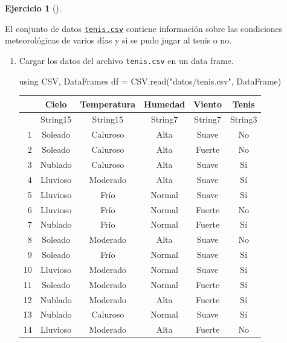 \documentclass[
  a4paper,
]{scrreport}
\newenvironment{Shaded}{\begin{snugshade}}{\end{snugshade}}
\newcommand{\BuiltInTok}[1]{\textcolor[rgb]{0.00,0.23,0.31}{#1}}
\newcommand{\FunctionTok}[1]{\textcolor[rgb]{0.28,0.35,0.67}{#1}}
\newcommand{\ImportTok}[1]{\textcolor[rgb]{0.00,0.46,0.62}{#1}}
\newcommand{\NormalTok}[1]{\textcolor[rgb]{0.00,0.23,0.31}{#1}}
\newcommand{\OperatorTok}[1]{\textcolor[rgb]{0.37,0.37,0.37}{#1}}
\newcommand{\StringTok}[1]{\textcolor[rgb]{0.13,0.47,0.30}{#1}}
\theoremstyle{definition}
\newtheorem{exercise}{Ejercicio}[chapter]
\theoremstyle{remark}
\begin{document}
\begin{exercise}[]\protect\hypertarget{exr-arboles-decision-1}{}\label{exr-arboles-decision-1}

El conjunto de datos \href{./datos/tenis.csv}{\texttt{tenis.csv}}
contiene información sobre las condiciones meteorológicas de varios días
y si se pudo jugar al tenis o no.

\begin{enumerate}
\def\labelenumi{\alph{enumi}.}
\item
  Cargar los datos del archivo \texttt{tenis.csv} en un data frame.

  \begin{tcolorbox}[enhanced jigsaw, toptitle=1mm, colframe=quarto-callout-tip-color-frame, titlerule=0mm, left=2mm, arc=.35mm, colbacktitle=quarto-callout-tip-color!10!white, opacityback=0, bottomtitle=1mm, toprule=.15mm, coltitle=black, breakable, colback=white, rightrule=.15mm, opacitybacktitle=0.6, leftrule=.75mm, bottomrule=.15mm, title=\textcolor{quarto-callout-tip-color}{\faLightbulb}\hspace{0.5em}{Solución}]

\begin{Shaded}
\begin{Highlighting}[]
\ImportTok{using} \BuiltInTok{CSV}\NormalTok{, }\BuiltInTok{DataFrames}
\NormalTok{df }\OperatorTok{=}\NormalTok{ CSV.}\FunctionTok{read}\NormalTok{(}\StringTok{"datos/tenis.csv"}\NormalTok{, DataFrame)}
\end{Highlighting}
\end{Shaded}

  \begin{tabular}{r|ccccc}
      & Cielo & Temperatura & Humedad & Viento & Tenis\\
      \hline
      & String15 & String15 & String7 & String7 & String3\\
      \hline
      1 & Soleado & Caluroso & Alta & Suave & No \\
      2 & Soleado & Caluroso & Alta & Fuerte & No \\
      3 & Nublado & Caluroso & Alta & Suave & Sí \\
      4 & Lluvioso & Moderado & Alta & Suave & Sí \\
      5 & Lluvioso & Frío & Normal & Suave & Sí \\
      6 & Lluvioso & Frío & Normal & Fuerte & No \\
      7 & Nublado & Frío & Normal & Fuerte & Sí \\
      8 & Soleado & Moderado & Alta & Suave & No \\
      9 & Soleado & Frío & Normal & Suave & Sí \\
      10 & Lluvioso & Moderado & Normal & Suave & Sí \\
      11 & Soleado & Moderado & Normal & Fuerte & Sí \\
      12 & Nublado & Moderado & Alta & Fuerte & Sí \\
      13 & Nublado & Caluroso & Normal & Suave & Sí \\
      14 & Lluvioso & Moderado & Alta & Fuerte & No \\
  \end{tabular}


\end{tcolorbox}
\end{enumerate}
\end{exercise}
\end{document}
